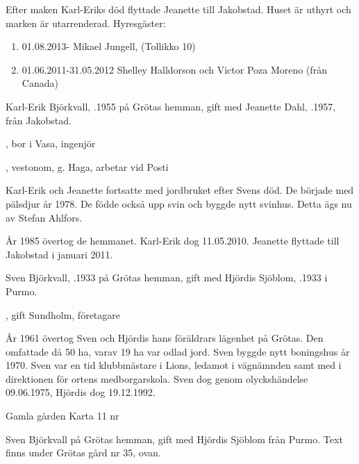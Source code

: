 Efter maken Karl-Eriks död flyttade Jeanette till Jakobstad. Huset är uthyrt och marken är utarrenderad.
Hyresgäster:
\begin{enumerate}
  \item 01.08.2013-   Mikael Jungell,  (Tollikko 10)
  \item 01.06.2011-31.05.2012  Shelley Halldorson och Victor Poza Moreno (från Canada)
\end{enumerate}


Karl-Erik Björkvall, .1955 på Grötas hemman, gift med Jeanette Dahl, .1957, från Jakobstad.
\begin{jhchildren}
  \item {}, bor i Vasa, ingenjör
  \item {}, vestonom, g. Haga, arbetar vid Posti
\end{jhchildren}


Karl-Erik och Jeanette fortsatte med  jordbruket efter Svens död. De började med pälsdjur år 1978. De födde också upp svin och byggde nytt svinhus. Detta ägs nu av Stefan Ahlfors.

År 1985 övertog de hemmanet. Karl-Erik dog 11.05.2010. Jeanette flyttade till Jakobstad i januari 2011.


Sven Björkvall, .1933 på Grötas hemman, gift med Hjördis Sjöblom, .1933 i Purmo.
\begin{jhchildren}
  \item {}
  \item {}, gift Sundholm, företagare
\end{jhchildren}
År 1961 övertog Sven och Hjördis hans föräldrars lägenhet på Grötas. Den omfattade då 50 ha, varav 19 ha var odlad jord. Sven byggde nytt boningshus år 1970. Sven var en tid klubbmästare i Lions, ledamot i vägnämnden samt med i direktionen för ortens medborgarskola. Sven dog genom olyckshändelse 09.06.1975, Hjördis dog 19.12.1992.



  	Gamla gården  Karta 11     nr 


Sven Björkvall på Grötas hemman, gift med Hjördis Sjöblom från Purmo. Text finns under Grötas gård nr 35, ovan.



